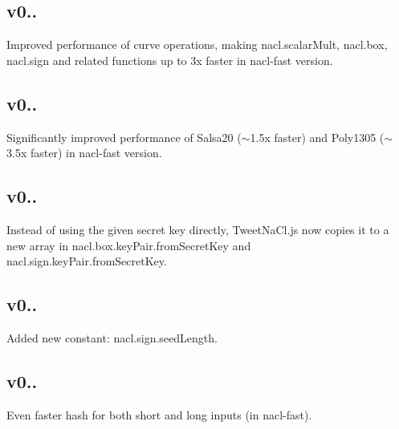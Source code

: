 \subsection*{v0.. }


\begin{DoxyItemize}
\item Improved performance of curve operations, making {\ttfamily nacl.\+scalar\+Mult}, {\ttfamily nacl.\+box}, {\ttfamily nacl.\+sign} and related functions up to 3x faster in {\ttfamily nacl-\/fast} version.
\end{DoxyItemize}

\subsection*{v0.. }


\begin{DoxyItemize}
\item Significantly improved performance of Salsa20 ($\sim$1.5x faster) and Poly1305 ($\sim$3.5x faster) in {\ttfamily nacl-\/fast} version.
\end{DoxyItemize}

\subsection*{v0.. }


\begin{DoxyItemize}
\item Instead of using the given secret key directly, Tweet\+Na\+Cl.\+js now copies it to a new array in {\ttfamily nacl.\+box.\+key\+Pair.\+from\+Secret\+Key} and {\ttfamily nacl.\+sign.\+key\+Pair.\+from\+Secret\+Key}.
\end{DoxyItemize}

\subsection*{v0.. }


\begin{DoxyItemize}
\item Added new constant\+: {\ttfamily nacl.\+sign.\+seed\+Length}.
\end{DoxyItemize}

\subsection*{v0.. }


\begin{DoxyItemize}
\item Even faster hash for both short and long inputs (in {\ttfamily nacl-\/fast}).
\end{DoxyItemize}

